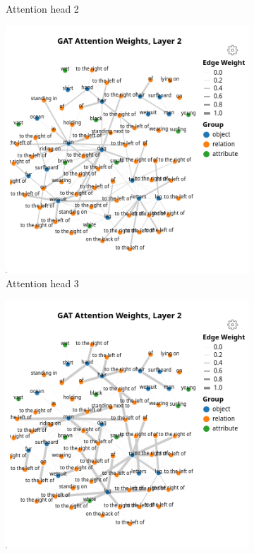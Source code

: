 \begin{figure}[htbp]
\begin{subfigure}[r]{0.49\textwidth}
        \caption{Attention head 2}
    \end{subfigure}
    \begin{subfigure}[l]{0.49\textwidth}
        \includegraphics[width=\textwidth]{figures/positive_logical/positive_logical_gat_l2_h2.png}
        \caption{Attention head 3}
    \end{subfigure}
    \begin{subfigure}[r]{0.49\textwidth}
        \includegraphics[width=\textwidth]{figures/positive_logical/positive_logical_gat_l2_h3.png}

\end{subfigure}
\end{figure}

